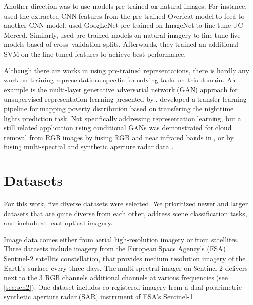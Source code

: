 Another direction was to use models pre-trained on natural images. For instance, \citet{marmanis2016} used the extracted CNN features from the pre-trained Overfeat model \citep{sermanet2013:overfeat} to feed to another CNN model. \citet{castelluccio2015} used GoogLeNet \citep{szegedy15:googlenet} pre-trained on ImageNet to fine-tune UC Merced.
Similarly, \citet{nogueira2016:cnn} used pre-trained models on natural imagery to fine-tune five models based of cross--validation splits. Afterwards, they trained an additional SVM on the fine-tuned features to achieve best performance.


Although there are works in using pre-trained representations, there is hardly any work on training representations specific for solving tasks on this domain. An example is the multi-layer generative adversarial network (GAN) \citep{goodfellow2014:gan} approach for unsupervised representation learning presented by \citet{lin2017:rs-gan-rl}. \citet{xie2015:tl-poverty-mapping} developed a transfer learning pipeline for mapping poverty distribution based on transfering the nighttime lights prediction task. Not specifically addressing representation learning, but a still related application using conditional GANs \citep{mirza2014:cgan} was demonstrated for cloud removal from RGB images by fusing RGB and near infrared bands in \citet{enomoto2017:rs-cgan}, or by fusing multi-spectral and synthetic aperture radar data \citep{grohnfeldt2018:rs-cgan}.



\section{Datasets}
\label{sec:datasets}
For this work, five diverse datasets were selected. We prioritized newer and larger datasets that are quite diverse from each other, address scene classification tasks, and include at least optical imagery. 

Image data comes either from aerial high-resolution imagery or from satellites. Three datasets include imagery from the European Space Agency's (ESA) Sentinel-2 satellite constellation, that provides medium resolution imagery of the Earth's surface every three days. The multi-spectral imager on Sentinel-2 delivers next to the 3 RGB channels additional channels at various frequencies (see \cref{sec:sen2}).
One dataset includes co-registered imagery from a dual-polarimetric synthetic aperture radar (SAR) instrument of ESA's Sentinel-1.



